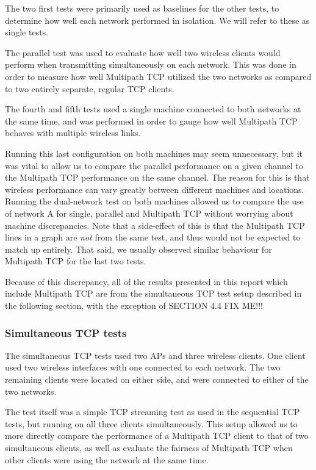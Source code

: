 The two first tests were primarily used as baselines for the other tests, to determine
how well each network performed in isolation. We will refer to these as single tests.

The parallel test was used to evaluate how well two wireless clients would perform
when transmitting simultaneously on each network. This was done in order to
measure how well Multipath TCP utilized the two networks as compared to two
entirely separate, regular TCP clients.

The fourth and fifth tests used a single machine connected to both networks at
the same time, and was performed in order to gauge how well Multipath TCP behaves
with multiple wireless links.

Running this last configuration on both machines may seem unnecessary,
but it was vital to allow us to compare the parallel performance on a
given channel to the Multipath TCP performance on the same channel. The reason
for this is that wireless performance can vary greatly between different machines and
locations. Running the dual-network test on both machines allowed us to compare
the use of network A for single, parallel and Multipath TCP without worrying
about machine discrepancies. Note that a side-effect of this is that the
Multipath TCP lines in a graph are \emph{not} from the same test, and thus
would not be expected to match up entirely. That said, we usually observed
similar behaviour for Multipath TCP for the last two tests.

Because of this discrepancy, all of the results presented in this report which
include Multipath TCP are
from the simultaneous TCP test setup described in the following section, with
the exception of SECTION 4.4 FIX ME!!!

\subsubsection{Simultaneous TCP tests}
\label{sec:met:setups:simtcp}
The simultaneous TCP tests used two APs and three
wireless clients. One client used two wireless interfaces with one
connected to each network. The two remaining clients were located on either side, and were connected to either of the two networks.

The test itself was a simple TCP streaming test as used in the sequential TCP
tests, but running on all three clients simultaneously. This setup allowed
us to more directly compare the performance of a Multipath TCP client to that of
two simultaneous clients, as well as evaluate the fairness of Multipath TCP when
other clients were using the network at the same time.

